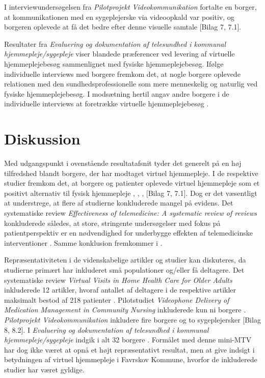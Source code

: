 I interviewundersøgelsen fra \textit{Pilotprojekt Videokommunikation} fortalte en borger, at kommunikationen med en sygeplejerske via videoopkald var positiv, og borgeren oplevede at få det bedre efter denne visuelle samtale [Bilag 7, 7.1]. 

Resultater fra \textit{Evaluering og dokumentation af telesundhed i kommunal hjemmepleje/sygepleje} viser blandede præferencer ved levering af virtuelle hjemmeplejebesøg sammenlignet med fysiske hjemmeplejebesøg. Ifølge individuelle interviews med borgere fremkom det, at nogle borgere oplevede relationen med den sundhedsprofessionelle som mere menneskelig og naturlig ved fysiske hjemmeplejebesøg. I modsætning hertil angav andre borgere i de individuelle interviews at foretrække virtuelle hjemmeplejebesøg \cite{kandidat}.

\section{Diskussion}
Med udgangspunkt i ovenstående resultatafsnit tyder det generelt på en høj tilfredshed blandt borgere, der har modtaget virtuel hjemmepleje. I de respektive studier fremkom det, at borgere og patienter oplevede virtuel hjemmepleje som et positivt alternativ til fysisk hjemmepleje  \cite{wade}, \cite{Baf2}, \cite{kandidat}, [Bilag 7, 7.1]. Dog er det væsentligt at understrege, at flere af studierne konkluderede mangel på evidens. Det systematiske review \textit{Effectiveness of telemedicine: A systematic review of reviews} konkluderede således, at store, stringente undersøgelser med fokus på patientperspektiv er en nødvendighed for underbygge effekten af telemedicinske interventioner \cite{Ekeland}. Samme konklusion fremkommer i  \cite{Mair}. 

Repræsentativiteten i de videnskabelige artikler og studier kan diskuteres, da studierne primært har inkluderet små populationer og/eller få deltagere. Det systematiske review \textit{Virtual Visits in Home Health Care for Older Adults} inkluderede 12 artikler, hvoraf antallet af deltagere i de respektive artikler maksimalt bestod af 218 patienter \cite{Baf2}. Pilotstudiet \textit{Videophone Delivery of Medication Management in Community Nursing} inkluderede kun ni borgere \cite{wade}. \textit{Pilotprojekt Videokommunikation} inkludere fire borgere og to sygeplejersker [Bilag 8, 8.2]. I \textit{Evaluering og dokumentation af telesundhed i kommunal hjemmepleje/sygepleje} indgik i alt 32 borgere \cite{kandidat}. Formålet med denne mini-MTV har dog ikke været at opnå et højt repræsentativt resultat, men at give indsigt i betydningen af virtuel hjemmepleje i Favrskov Kommune, hvorfor de inkluderede studier har været gyldige. 


